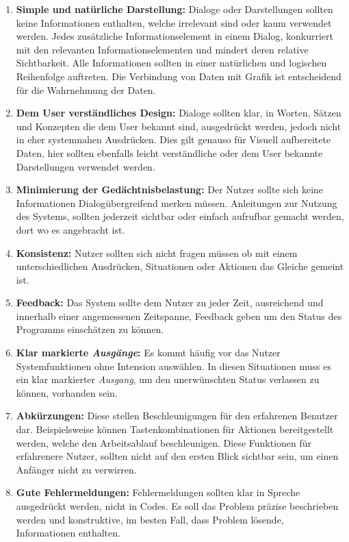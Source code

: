 \documentclass[draft=false
              ,paper=a4
              ,twoside=false
              ,fontsize=11pt
              ,headsepline
              ,BCOR10mm
              ,DIV11
              ]{scrbook}
\begin{document}
\begin{enumerate}
  \item \textbf{Simple und natürliche Darstellung:} Dialoge oder Darstellungen sollten keine Informationen enthalten, welche irrelevant sind oder kaum verwendet werden. Jedes zusätzliche Informationselement in einem Dialog, konkurriert mit den relevanten Informationselementen und mindert deren relative Sichtbarkeit. Alle Informationen sollten in einer natürlichen und logischen Reihenfolge auftreten. Die Verbindung von Daten mit Grafik ist entscheidend für die Wahrnehmung der Daten.
  \item \textbf{Dem User verständliches Design:} Dialoge sollten klar, in Worten, Sätzen und Konzepten die dem User bekannt sind, ausgedrückt werden, jedoch nicht in eher systemnahen Ausdrücken. Dies gilt genauso für Visuell aufbereitete Daten, hier sollten ebenfalls leicht verständliche oder dem User bekannte Darstellungen verwendet werden.
  \item \textbf{Minimierung der Gedächtnisbelastung:} Der Nutzer sollte sich keine Informationen Dialogübergreifend merken müssen. Anleitungen zur Nutzung des Systems, sollten jederzeit sichtbar oder einfach aufrufbar gemacht werden, dort wo es angebracht ist.
  \item \textbf{Konsistenz:} Nutzer sollten sich nicht fragen müssen ob mit einem unterschiedlichen Ausdrücken, Situationen oder Aktionen das Gleiche gemeint ist. 
  \item \textbf{Feedback:} Das System sollte dem Nutzer zu jeder Zeit, ausreichend und innerhalb einer angemessenen Zeitspanne, Feedback geben um den Status des Programms einschätzen zu können. 
  \item \textbf{Klar markierte \textit{Ausgänge}:} Es kommt häufig vor das Nutzer Systemfunktionen ohne Intension auswählen. In diesen Situationen muss es ein klar markierter \textit{Ausgang}, um den unerwünschten Status verlassen zu können, vorhanden sein. 
  \item \textbf{Abkürzungen:} Diese stellen Beschleunigungen für den erfahrenen Benutzer dar. Beispielsweise können Tastenkombinationen für Aktionen bereitgestellt werden, welche den Arbeitsablauf beschleunigen.  Diese Funktionen für erfahrenere Nutzer, sollten nicht auf den ersten Blick sichtbar sein, um einen Anfänger nicht zu verwirren.
  \item \textbf{Gute Fehlermeldungen:} Fehlermeldungen sollten klar in Spreche ausgedrückt werden, nicht in Codes. Es soll das Problem präzise beschrieben werden und konstruktive, im besten Fall, dass Problem lösende, Informationen enthalten.

\end{enumerate}
\end{document}
